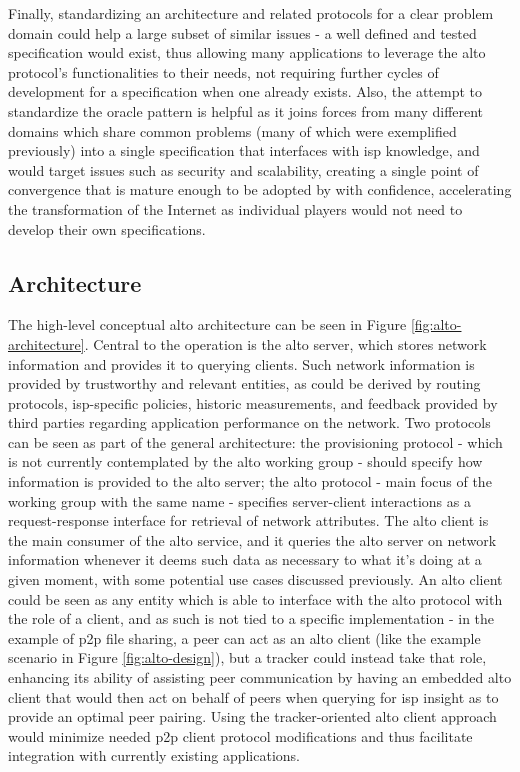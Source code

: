     Finally, standardizing an architecture and related protocols for a clear problem domain could help a large subset of similar issues - a well defined and tested specification would exist, thus allowing many applications to leverage the \gls{alto} protocol's functionalities to their needs, not requiring further cycles of development for a specification when one already exists.
    Also, the attempt to standardize the oracle pattern is helpful as it joins forces from many different domains which share common problems (many of which were exemplified previously) into a single specification that interfaces with \gls{isp} knowledge, and would target issues such as security and scalability, creating a single point of convergence that is mature enough to be adopted by with confidence, accelerating the transformation of the Internet as individual players would not need to develop their own specifications.

\subsection{Architecture}

    The high-level conceptual \gls{alto} architecture can be seen in Figure \ref{fig:alto-architecture}.
        Central to the operation is the \gls{alto} server, which stores network information and provides it to querying clients.
        Such network information is provided by trustworthy and relevant entities, as could be derived by routing protocols, \gls{isp}-specific policies, historic measurements, and feedback provided by third parties regarding application performance on the network.
        Two protocols can be seen as part of the general architecture: the provisioning protocol - which is not currently contemplated by the \gls{alto} working group - should specify how information is provided to the \gls{alto} server; the \gls{alto} protocol - main focus of the working group with the same name - specifies server-client interactions as a request-response interface for retrieval of network attributes.
        The \gls{alto} client is the main consumer of the \gls{alto} service, and it queries the \gls{alto} server on network information whenever it deems such data as necessary to what it's doing at a given moment, with some potential use cases discussed previously.
        An \gls{alto} client could be seen as any entity which is able to interface with the \gls{alto} protocol with the role of a client, and as such is not tied to a specific implementation - in the example of \gls{p2p} file sharing, a peer can act as an \gls{alto} client (like the example scenario in Figure \ref{fig:alto-design}), but a tracker could instead take that role, enhancing its ability of assisting peer communication by having an embedded \gls{alto} client that would then act on behalf of peers when querying for \gls{isp} insight as to provide an optimal peer pairing.
        Using the tracker-oriented \gls{alto} client approach would minimize needed \gls{p2p} client protocol modifications and thus facilitate integration with currently existing applications.

